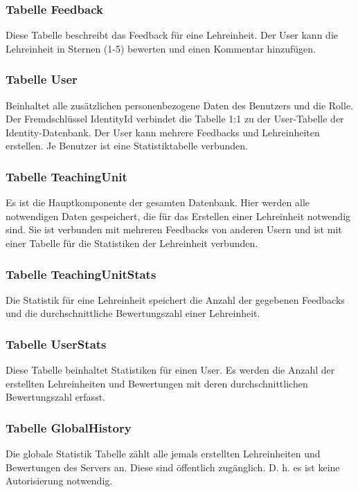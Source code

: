 \subsubsection{Tabelle Feedback}
Diese Tabelle beschreibt das Feedback für eine Lehreinheit. Der User kann die Lehreinheit in Sternen (1-5) bewerten und einen Kommentar hinzufügen. 

\subsubsection{Tabelle User}
Beinhaltet alle zusätzlichen personenbezogene Daten des Benutzers und die Rolle. Der Fremdschlüssel IdentityId verbindet die Tabelle 1:1 zu der User-Tabelle 
der Identity-Datenbank. Der User kann mehrere Feedbacks und Lehreinheiten erstellen. Je Benutzer ist eine Statistiktabelle verbunden.

\subsubsection{Tabelle TeachingUnit}
Es ist die Hauptkomponente der gesamten Datenbank. Hier werden alle notwendigen Daten gespeichert, die für das Erstellen einer Lehreinheit notwendig sind. 
Sie ist verbunden mit mehreren Feedbacks von anderen Usern und ist mit einer Tabelle für die Statistiken der Lehreinheit verbunden.

\subsubsection{Tabelle TeachingUnitStats}
Die Statistik für eine Lehreinheit speichert die Anzahl der gegebenen Feedbacks und die durchschnittliche Bewertungszahl einer Lehreinheit.

\subsubsection{Tabelle UserStats}
Diese Tabelle beinhaltet Statistiken für einen User. Es werden die Anzahl der erstellten Lehreinheiten und Bewertungen mit deren durchschnittlichen Bewertungszahl erfasst.

\subsubsection{Tabelle GlobalHistory}
Die globale Statistik Tabelle zählt alle jemals erstellten Lehreinheiten und Bewertungen des Servers an. Diese sind öffentlich zugänglich. 
D. h. es ist keine Autorisierung  notwendig.

